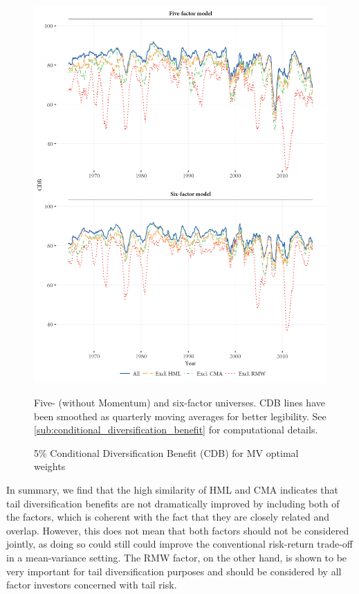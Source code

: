 \begin{figure}[p]
  \centering
  \footnotesize
  \includegraphics[width=\textwidth]{graphics/cdb/MV.png}
  \caption{5\% Conditional Diversification Benefit (CDB) for MV optimal weights}

  \begin{longcaption}
    Five- (without Momentum) and six-factor universes. CDB lines have been smoothed as quarterly moving averages for better legibility. See \autoref{sub:conditional_diversification_benefit} for computational details.
  \end{longcaption}
  \label{fig:mv_cdb}
\end{figure}



In summary, we find that the high similarity of HML and CMA indicates that tail diversification benefits are not dramatically improved by including both of the factors, which is coherent with the fact that they are closely related and overlap. However, this does not mean that both factors should not be considered jointly, as doing so could still could improve the conventional risk-return trade-off in a mean-variance setting. The RMW factor, on the other hand, is shown to be very important for tail diversification purposes and should be considered by all factor investors concerned with tail risk.

